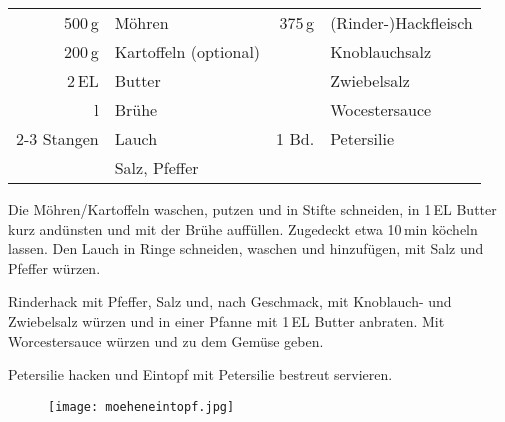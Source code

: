 \begin{table}[H]
  \centering
    
  \begin{tabular*}{1\textwidth}{rlrl}
    500\,g & M\"{o}hren  & 375\,g & (Rinder-)Hackfleisch \\
	200\,g & Kartoffeln (optional) & & Knoblauchsalz \\
	2\,EL & Butter & & Zwiebelsalz \\
	\nicefrac{1}{2}\,l & Br\"{u}he &  & Wocestersauce \\
	2-3 Stangen & Lauch & 1 Bd.& Petersilie \\
	& Salz, Pfeffer &  & \\
  \end{tabular*}
\end{table}

\begin{Notes}
\item Die M\"{o}hren/Kartoffeln waschen, putzen und in Stifte schneiden, in 1\,EL Butter kurz and\"{u}nsten und mit der Br\"{u}he auff\"{u}llen. Zugedeckt etwa 10\,min k\"{o}cheln lassen. Den Lauch in Ringe schneiden, waschen und hinzuf\"{u}gen, mit Salz und Pfeffer w\"{u}rzen.
\item Rinderhack mit Pfeffer, Salz und, nach Geschmack, mit Knoblauch- und Zwiebelsalz w\"{u}rzen und in einer Pfanne mit 1\,EL Butter anbraten. Mit Worcestersauce w\"{u}rzen und zu dem Gem\"{u}se geben.
\item Petersilie hacken und Eintopf mit Petersilie bestreut servieren.
\end{Notes}
\vfill
\begin{figure}[H]
  \centering
  \texttt{[image: moeheneintopf.jpg]}
\end{figure}
\newpage
